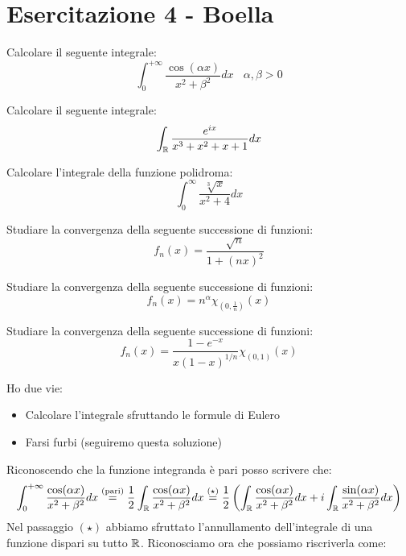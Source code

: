 \chapter{Esercitazione 4 - Boella}
\ParteEsercizi
\Esercizio{}

Calcolare il seguente integrale:
\begin{equation*}
\int^{+ \infty}_{0}\frac{\cos (\alpha x)}{x^{2} + \beta^{2}} dx\ \ \ \ \alpha, \beta  > 0
\end{equation*}
\Esercizio{}

Calcolare il seguente integrale:
\begin{equation*}
\int_{\mathbb{R}}\frac{e^{ix}}{x^{3} + x^{2} + x + 1} dx
\end{equation*}
\Esercizio{}

Calcolare l'integrale della funzione polidroma:
\begin{equation*}
\int^{\infty}_{0}\frac{\sqrt[3]{x}}{x^{2} + 4} dx
\end{equation*}
\Esercizio{}

Studiare la convergenza della seguente successione di funzioni:
\begin{equation*}
f_{n} (x) = \frac{\sqrt{n}}{1 + (nx)^{2}}
\end{equation*}
\Esercizio{}

Studiare la convergenza della seguente successione di funzioni:
\begin{equation*}
f_{n} (x) = n^{\alpha} \chi_{\left(0, \frac{1}{n}\right)} (x)
\end{equation*}
\Esercizio{}

Studiare la convergenza della seguente successione di funzioni:
\begin{equation*}
f_{n} (x) = \frac{1 - e^{- x}}{x(1 - x)^{1/n}} \chi_{(0, 1)} (x)
\end{equation*}
\ParteSoluzioni
\Soluzione

Ho due vie:
\begin{itemize}
\item Calcolare l'integrale sfruttando le formule di Eulero
\item Farsi furbi (seguiremo questa soluzione)
\end{itemize}

Riconoscendo che la funzione integranda è pari posso scrivere che:
\begin{equation*}
\int^{+ \infty}_{0}\frac{\cos (\alpha x)}{x^{2} + \beta^{2}} dx\overset{\text{(pari)}}{=}\frac{1}{2}\int_{\mathbb{R}}\frac{\cos (\alpha x)}{x^{2} + \beta^{2}} dx\overset{(\star)}{=}\frac{1}{2}\left(\int_{\mathbb{R}}\frac{\cos (\alpha x)}{x^{2} + \beta^{2}} dx + i\int_{\mathbb{R}}\frac{\sin (\alpha x)}{x^{2} + \beta^{2}} dx\right)
\end{equation*}
Nel passaggio $(\star)$ abbiamo sfruttato l'annullamento dell'integrale di una funzione dispari su tutto $\mathbb{R} $. Riconosciamo ora che possiamo riscriverla come:


